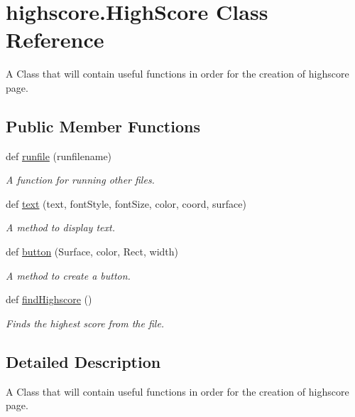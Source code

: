 \hypertarget{classhighscore_1_1HighScore}{}\section{highscore.\+High\+Score Class Reference}
\label{classhighscore_1_1HighScore}


A Class that will contain useful functions in order for the creation of highscore page.  


\subsection*{Public Member Functions}
\begin{DoxyCompactItemize}
\item 
def \hyperlink{classhighscore_1_1HighScore_a790e2026c698c7a97f3302a17d324a72}{runfile} (runfilename)
\begin{DoxyCompactList}\small\item\em A function for running other files. \end{DoxyCompactList}\item 
def \hyperlink{classhighscore_1_1HighScore_a5fad87aae40bcfc2f5a1b2c5726bf650}{text} (text, font\+Style, font\+Size, color, coord, surface)
\begin{DoxyCompactList}\small\item\em A method to display text. \end{DoxyCompactList}\item 
def \hyperlink{classhighscore_1_1HighScore_a857b76e0be22a3d5476690a253fdd604}{button} (Surface, color, Rect, width)
\begin{DoxyCompactList}\small\item\em A method to create a button. \end{DoxyCompactList}\item 
def \hyperlink{classhighscore_1_1HighScore_a9db9bf4036615d55829c96cd1d78ba88}{find\+Highscore} ()
\begin{DoxyCompactList}\small\item\em Finds the highest score from the file. \end{DoxyCompactList}\end{DoxyCompactItemize}


\subsection{Detailed Description}
A Class that will contain useful functions in order for the creation of highscore page. 

